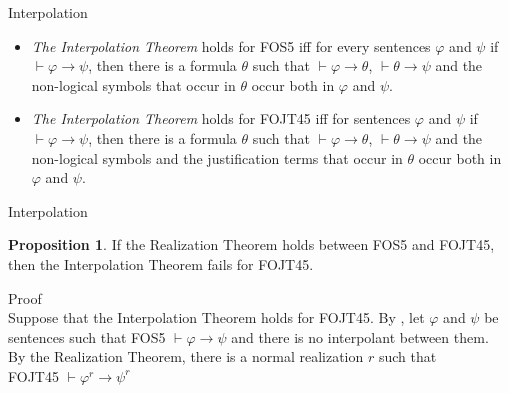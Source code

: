 \documentclass{beamer}
\theoremstyle{definition}
\newtheorem{pro}{Proposition}
\newcommand{\impli}{\rightarrow}
\newcommand{\teo}{\vdash}
\begin{document}
\begin{frame}{Interpolation}


\begin{itemize}

\item \textit{The Interpolation Theorem} holds for FOS5 iff for every sentences $\varphi$ and $\psi$  if $\teo \varphi \impli\psi$, then there is a formula $\theta$ such that $\teo \varphi \impli \theta$, $\teo \theta \impli \psi$ and the non-logical symbols that occur in $\theta$ occur both in $\varphi$ and $\psi$.
\vspace{5mm}
\item \textit{The Interpolation Theorem} holds for FOJT45 iff for sentences $\varphi$ and $\psi$ if $\teo \varphi \impli\psi$, then there is a formula $\theta$ such that $\teo \varphi \impli \theta$, $\teo \theta \impli \psi$ and the non-logical symbols and the justification terms that occur in $\theta$ occur both in $\varphi$ and $\psi$.
\end{itemize}
	
\end{frame}



\begin{frame}{Interpolation}

\begin{pro}
If the Realization Theorem holds between FOS5 and FOJT45, then the Interpolation Theorem fails for FOJT45. 
\end{pro}

{\color{blue} Proof}\\ 
\qquad Suppose that the Interpolation Theorem holds for FOJT45. By \cite{Fine79}, let $\varphi$ and $\psi$ be sentences such that FOS5 $\teo \varphi \impli \psi$ and there is no interpolant between them.\\
\vspace{5mm}
\qquad By the Realization Theorem, there is a normal realization $r$ such that\\
\vspace{5mm}
FOJT45 $\teo \varphi^{r} \impli \psi^{r}$\\
\end{frame}
\end{document}
